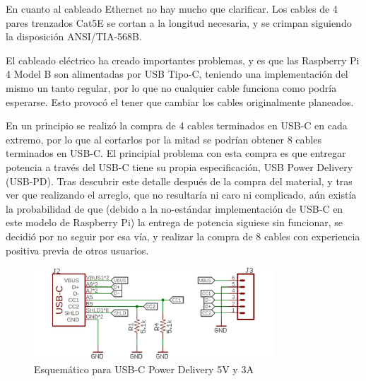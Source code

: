 En cuanto al cableado Ethernet no hay mucho que clarificar. Los cables de 4 pares trenzados Cat5E se cortan a la longitud necesaria, y se crimpan siguiendo la disposición ANSI/TIA-568B.

El cableado eléctrico ha creado importantes problemas, y es que las Raspberry Pi 4 Model B son alimentadas por USB Tipo-C, teniendo una implementación del mismo un tanto regular, por lo que no cualquier cable funciona como podría esperarse. Esto provocó el tener que cambiar los cables originalmente planeados.

En un principio se realizó la compra de 4 cables terminados en USB-C en cada extremo, por lo que al cortarlos por la mitad se podrían obtener 8 cables terminados en USB-C. El principial problema con esta compra es que entregar potencia a través del USB-C tiene su propia especificación, USB Power Delivery (USB-PD). Tras descubrir este detalle después de la compra del material, y tras ver que realizando el arreglo, que no resultaría ni caro ni complicado, aún existía la probabilidad de que (debido a la no-estándar implementación de USB-C en este modelo de Raspberry Pi) la entrega de potencia siguiese sin funcionar, se decidió por no seguir por esa vía, y realizar la compra de 8 cables con experiencia positiva previa de otros usuarios.

\begin{figure}[h!]
  \vspace*{0.5cm}
  \centering
  \includegraphics[width=0.8\textwidth]{img/usb_pd_schematic.jpg}
  \caption{Esquemático para USB-C Power Delivery 5V y 3A \cite{usb_pd_techforum}}
  \label{fig:usb_pd_schematic}
  \vspace*{0.1cm}
\end{figure}

